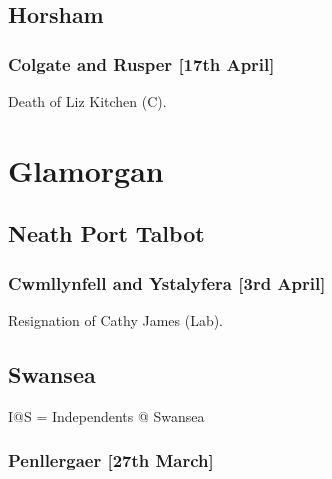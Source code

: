 \documentclass[a4paper,openany]{book}
\begin{document}
\begin{resultsiii}
\subsection*{Horsham}

\subsubsection*{Colgate and Rusper \hspace*{\fill}\nolinebreak[1]%
	\enspace\hspace*{\fill}
	[17th April]}


Death of Liz Kitchen (C).

\section{Glamorgan}

\subsection*{Neath Port Talbot}

\subsubsection*{Cwmllynfell and Ystalyfera \hspace*{\fill}\nolinebreak[1]%
	\enspace\hspace*{\fill}
	[3rd April]}


Resignation of Cathy James (Lab).

\subsection*{Swansea}

I@S = Independents @ Swansea

\subsubsection*{Penllergaer \hspace*{\fill}\nolinebreak[1]%
	\enspace\hspace*{\fill}
	[27th March]}


\end{resultsiii}
\end{document}
